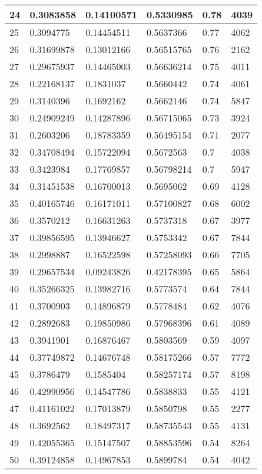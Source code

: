 \begin{longtable}{|l|l|l|l|l|l|}
24 & 0.3083858 & 0.14100571 & 0.5330985 & 0.78 & 4039 \\ \hline 
25 & 0.3094775 & 0.14454511 & 0.5637366 & 0.77 & 4062 \\ \hline 
26 & 0.31699878 & 0.13012166 & 0.56515765 & 0.76 & 2162 \\ \hline 
27 & 0.29675937 & 0.14465003 & 0.56636214 & 0.75 & 4011 \\ \hline 
28 & 0.22168137 & 0.1831037 & 0.5660442 & 0.74 & 4061 \\ \hline 
29 & 0.3140396 & 0.1692162 & 0.5662146 & 0.74 & 5847 \\ \hline 
30 & 0.24909249 & 0.14287896 & 0.56715065 & 0.73 & 3924 \\ \hline 
31 & 0.2603206 & 0.18783359 & 0.56495154 & 0.71 & 2077 \\ \hline 
32 & 0.34708494 & 0.15722094 & 0.5672563 & 0.7 & 4038 \\ \hline 
33 & 0.3423984 & 0.17769857 & 0.56798214 & 0.7 & 5947 \\ \hline 
34 & 0.31451538 & 0.16700013 & 0.5695062 & 0.69 & 4128 \\ \hline 
35 & 0.40165746 & 0.16171011 & 0.57100827 & 0.68 & 6002 \\ \hline 
36 & 0.3570212 & 0.16631263 & 0.5737318 & 0.67 & 3977 \\ \hline 
37 & 0.39856595 & 0.13946627 & 0.5753342 & 0.67 & 7844 \\ \hline 
38 & 0.2998887 & 0.16522598 & 0.57258093 & 0.66 & 7705 \\ \hline 
39 & 0.29657534 & 0.09243826 & 0.42178395 & 0.65 & 5864 \\ \hline 
40 & 0.35266325 & 0.13982716 & 0.5773574 & 0.64 & 7844 \\ \hline 
41 & 0.3700903 & 0.14896879 & 0.5778484 & 0.62 & 4076 \\ \hline 
42 & 0.2892683 & 0.19850986 & 0.57968396 & 0.61 & 4089 \\ \hline 
43 & 0.3941901 & 0.16876467 & 0.5803569 & 0.59 & 4097 \\ \hline 
44 & 0.37749872 & 0.14676748 & 0.58175266 & 0.57 & 7772 \\ \hline 
45 & 0.3786479 & 0.1585404 & 0.58257174 & 0.57 & 8198 \\ \hline 
46 & 0.42990956 & 0.14547786 & 0.5838833 & 0.55 & 4121 \\ \hline 
47 & 0.41161022 & 0.17013879 & 0.5850798 & 0.55 & 2277 \\ \hline 
48 & 0.3692562 & 0.18497317 & 0.58735543 & 0.55 & 4131 \\ \hline 
49 & 0.42055365 & 0.15147507 & 0.58853596 & 0.54 & 8264 \\ \hline 
50 & 0.39124858 & 0.14967853 & 0.5899784 & 0.54 & 4042 \\ \hline 
\end{longtable}